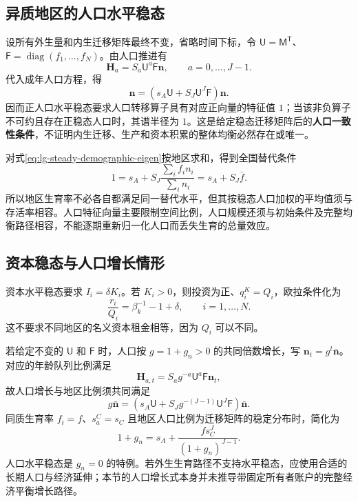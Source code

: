 \documentclass[UTF8,a4paper,zihao=-4,fontset=windows]{ctexart}
\numberwithin{equation}{section}
\newcommand{\invp}{Q}
\DeclareMathOperator{\diag}{diag}
\begin{document}
\subsection{异质地区的人口水平稳态}
设所有外生量和内生迁移矩阵最终不变，省略时间下标，令 $\mathsf U=\mathsf M^{\mathsf T}$、$\mathsf F=\diag(f_1,\ldots,f_N)$。由人口推进有
\begin{equation}
 \bm H_a=S_a\mathsf U^a\mathsf F\bm n,\qquad a=0,\ldots,J-1.
\end{equation}
代入成年人口方程，得
\begin{equation}
 \bm n=\left(s_A\mathsf U+S_J\mathsf U^J\mathsf F\right)\bm n.
 \label{eq:lg-steady-demographic-eigen}
\end{equation}
因而正人口水平稳态要求人口转移算子具有对应正向量的特征值 $1$；当该非负算子不可约且存在正稳态人口时，其谱半径为 $1$。这是给定稳态迁移矩阵后的\textbf{人口一致性条件}，不证明内生迁移、生产和资本积累的整体均衡必然存在或唯一。

对式\eqref{eq:lg-steady-demographic-eigen}按地区求和，得到全国替代条件
\begin{equation}
 1=s_A+S_J\frac{\sum_i f_in_i}{\sum_i n_i}
 =s_A+S_J\bar f.
 \label{eq:lg-heterogeneous-replacement}
\end{equation}
所以地区生育率不必各自都满足同一替代水平，但其按稳态人口加权的平均值须与存活率相容。人口特征向量主要限制空间比例，人口规模还须与初始条件及完整均衡路径相容，不能逐期重新归一化人口而丢失生育的总量效应。

\subsection{资本稳态与人口增长情形}
资本水平稳态要求 $I_i=\delta K_i$。若 $K_i>0$，则投资为正、$q^K_i=\invp_i$，欧拉条件化为
\begin{equation}
 \frac{r_i}{\invp_i}=\beta_k^{-1}-1+\delta,\qquad i=1,\ldots,N.
 \label{eq:lg-steady-capital-return}
\end{equation}
这不要求不同地区的名义资本租金相等，因为 $\invp_i$ 可以不同。

若给定不变的 $\mathsf U$ 和 $\mathsf F$ 时，人口按 $g=1+g_n>0$ 的共同倍数增长，写 $\bm n_t=g^t\bar{\bm n}$。对应的年龄队列比例满足
\begin{equation}
 \bm H_{a,t}=S_ag^{-a}\mathsf U^a\mathsf F\bm n_t,
\end{equation}
故人口增长与地区比例须共同满足
\begin{equation}
 g\bar{\bm n}=\left(s_A\mathsf U+S_Jg^{-(J-1)}\mathsf U^J\mathsf F\right)\bar{\bm n}.
 \label{eq:lg-growing-demography}
\end{equation}
同质生育率 $f_i=f$、$s^C_a=s_C$ 且地区人口比例为迁移矩阵的稳定分布时，简化为
\begin{equation}
 1+g_n=s_A+\frac{fs_C^J}{(1+g_n)^{J-1}}.
 \label{eq:lg-homogeneous-growth}
\end{equation}
人口水平稳态是 $g_n=0$ 的特例。若外生生育路径不支持水平稳态，应使用合适的长期人口与经济延伸；本节的人口增长式本身并未推导带固定所有者账户的完整经济平衡增长路径。
\end{document}
